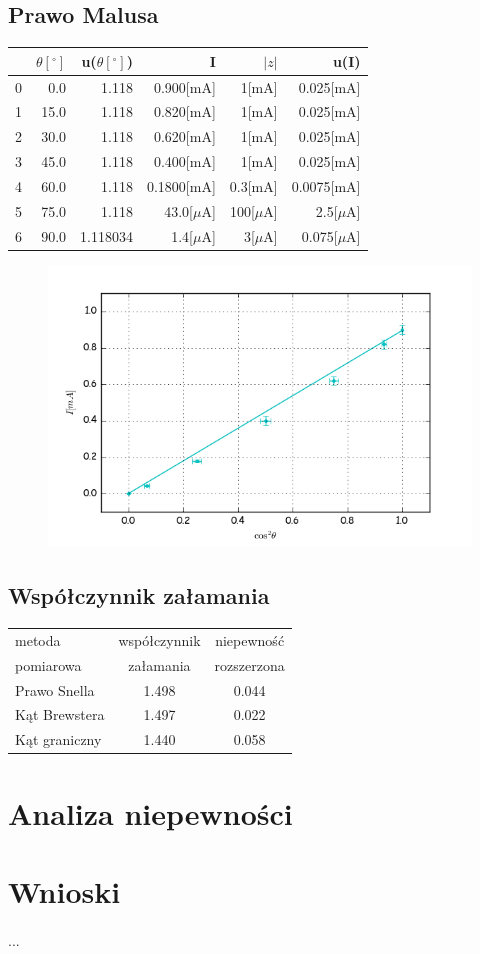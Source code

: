 \documentclass[a4paper,10pt]{article}
\begin{document}
\subsection{Prawo Malusa}
\begin{tabular}{lrrrrr}
\hline
{} &$\theta[^\circ]$&u($\theta[^\circ]$)&I&$|z|$&u(I) \\
\hline
0 &  0.0 & 1.118 & 0.900[mA] & 1[mA] & 0.025[mA] \\
1 & 15.0 & 1.118 & 0.820[mA] & 1[mA] & 0.025[mA] \\
2 & 30.0 & 1.118 & 0.620[mA] & 1[mA] & 0.025[mA] \\
3 & 45.0 & 1.118 & 0.400[mA] & 1[mA] & 0.025[mA] \\
4 & 60.0 & 1.118 & 0.1800[mA] & 0.3[mA] & 0.0075[mA] \\
5 & 75.0 & 1.118 & 43.0[$\mu$A] & 100[$\mu$A] & 2.5[$\mu$A] \\
6 &  90.0 &  1.118034 & 1.4[$\mu$A] &  3[$\mu$A] &  0.075[$\mu$A] \\
\hline
\end{tabular}
\begin{figure}[H]
  \includegraphics{./malus.png}
  \caption{}
\end{figure}

\subsection{Współczynnik załamania}
\begin{tabular}{|l|c|c|}
  \hline
  metoda & współczynnik &niepewność \\
  pomiarowa & załamania & rozszerzona\\\hline
  Prawo Snella & 1.498 & 0.044 \\\hline
  Kąt Brewstera& 1.497 & 0.022 \\\hline
  Kąt graniczny& 1.440 & 0.058 \\\hline
\end{tabular}

\section{Analiza niepewności}

\section{Wnioski}
\paragraph{}...
\end{document}
